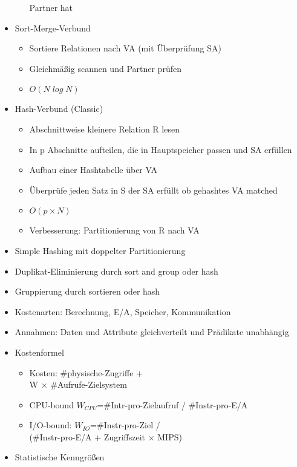 \documentclass[11pt, paper=a4, twocolumn]{scrartcl}
\begin{document}
\begin{itemize}
\begin{itemize}
						Partner hat
				\end{itemize}
			\item Sort-Merge-Verbund
				\begin{itemize}
					\item Sortiere Relationen nach VA (mit Überprüfung 
						SA)
					\item Gleichmäßig scannen und Partner prüfen
					\item $O(N\;log\;N)$
				\end{itemize}
			\item Hash-Verbund (Classic)
				\begin{itemize}
					\item Abschnittweise kleinere Relation R lesen
					\item In p Abschnitte aufteilen, die in 
						Hauptspeicher passen und SA erfüllen
					\item Aufbau einer Hashtabelle über VA
					\item Überprüfe jeden Satz in S der SA erfüllt ob 
						gehashtes VA matched
					\item $O(p\times N)$
					\item Verbesserung: Partitionierung von R nach VA
				\end{itemize}
			\item Simple Hashing mit doppelter Partitionierung
			\item Duplikat-Eliminierung durch sort and group oder hash
			\item Gruppierung durch sortieren oder hash
			\item Kostenarten: Berechnung, E/A, Speicher, Kommunikation
			\item Annahmen: Daten und Attribute gleichverteilt und Prädikate 
				unabhängig
			\item Kostenformel
				\begin{itemize}
					\item  Kosten: \#physische-Zugriffe + \\
						W $\times$ \#Aufrufe-Zielsystem
					\item CPU-bound $W_{CPU}$=\#Intr-pro-Zielaufruf / 
						\#Instr-pro-E/A
					\item I/O-bound: $W_{IO}$=\#Instr-pro-Ziel / \\ 
						(\#Instr-pro-E/A + Zugriffszeit $\times$ 
						MIPS)
				\end{itemize}
			\item Statistische Kenngrößen
				\begin{itemize}

\end{itemize}
\end{itemize}
\end{document}
